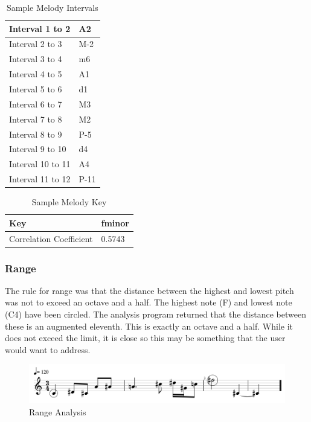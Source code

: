 \begin{table}[!htbp]
	\centering
	\caption{Sample Melody Intervals}
	\begin{tabular}{|l|l|}
		\hline
		Interval 1 to 2 & A2 \\ \hline
		Interval 2 to 3 & M-2 \\ \hline
		Interval 3 to 4 & m6 \\ \hline
		Interval 4 to 5 & A1 \\ \hline
		Interval 5 to 6 & d1 \\ \hline
		Interval 6 to 7 & M3 \\ \hline
		Interval 7 to 8 & M2 \\ \hline
		Interval 8 to 9 & P-5 \\ \hline
		Interval 9 to 10 & d4 \\ \hline
		Interval 10 to 11 & A4 \\ \hline
		Interval 11 to 12 & P-11 \\ \hline
	\end{tabular}
\end{table}

\begin{table}[!htbp]
	\centering
	\caption{Sample Melody Key}
	\begin{tabular}{|l|l|}
		\hline
		Key & f\sh minor \\ \hline
		Correlation Coefficient & 0.5743 \\ \hline
	\end{tabular}
\end{table}

\subsubsection{Range}
\label{subsubsec:range}

The rule for range was that the distance between the highest and lowest pitch was not to exceed an octave and a half.  The highest note (F) and lowest note (C4) have been circled.  The analysis program returned that the distance between these is an augmented eleventh.  This is exactly an octave and a half.  While it does not exceed the limit, it is close so this may be something that the user would want to address.

\begin{figure}[!htbp]
	\centering
	\caption{Range Analysis}
	\includegraphics[scale=0.4]{images/range.png}
\end{figure}

